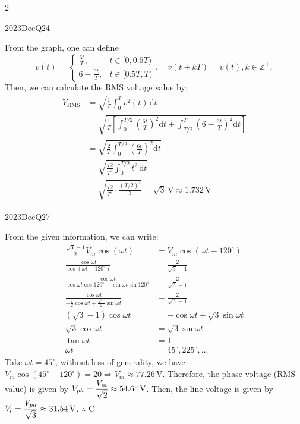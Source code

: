 \begin{multicols}{2}
\begin{qsolution}{2023}{Dec}{Q24}{\tgEE \tgEEPowerSystems \tgEERMS}

    From the graph, one can define
    \[
        v(t)=\begin{cases}
            \frac{6t}{T}, & t\in[0, 0.5T) \\
            6-\frac{6t}{T}, & t\in[0.5T, T)
        \end{cases}, \quad v(t+kT)=v(t), k\in\mathbb{Z}^+,
    \]
    Then, we can calculate the RMS voltage value by:
    \begin{align*}
        V_{\mathrm{RMS}} &= \sqrt{\frac{1}{T}\int_0^{T} v^2(t) \,\mathrm{d}t}\\
        &= \sqrt{\frac{1}{T}\left[\int_0^{T/2}\left(\frac{6t}{T}\right)^2\mathrm{d}t
            + \int_{T/2}^{T}\left(6-\frac{6t}{T}\right)^2\mathrm{d}t\right]}\\
        &= \sqrt{\frac{2}{T}\int_0^{T/2}\left(\frac{6t}{T}\right)^2\mathrm{d}t}\\
        &= \sqrt{\frac{72}{T^3}\int_0^{T/2} t^2\,\mathrm{d}t}\\
        &= \sqrt{\frac{72}{T^3}\cdot\frac{(T/2)^3}{3}}
        = \boxed{\sqrt{3}\,\mathrm{V}} \approx 1.732\,\mathrm{V}
    \end{align*}
\end{qsolution}

\begin{qsolution}{2023}{Dec}{Q27}{\tgEE \tgEEThreePhase}

    From the given information, we can write:
    \begin{align*}
        \frac{\sqrt{3}-1}{2}V_m\cos(\omega t) &= V_m\cos(\omega t-120^\circ)\\
        \frac{\cos \omega t}{\cos(\omega t-120^\circ)} &= \frac{2}{\sqrt{3}-1} \\
        \frac{\cos \omega t}{\cos \omega t\cos 120^\circ + \sin\omega t\sin 120^\circ} &= \frac{2}{\sqrt{3}-1}\\
        \frac{\cos \omega t}{-\frac{1}{2}\cos \omega t + \frac{\sqrt{3}}{2}\sin \omega t} &= \frac{2}{\sqrt{3}-1}\\
        \left(\sqrt{3}-1\right)\cos\omega t &= -\cos \omega t + \sqrt{3}\sin \omega t\\
        \sqrt{3}\cos \omega t &= \sqrt{3}\sin \omega t\\
        \tan \omega t &=1\\
        \omega t&=45^\circ, 225^\circ, \ldots
    \end{align*}
    Take $\omega t=45^\circ$, without loss of generality, we have $V_m\cos(45^\circ-120^\circ)=20 \Rightarrow V_m\approx 77.26\,\mathrm{V}$.
    Therefore, the phase voltage (RMS value) is given by $\displaystyle V_{ph}=\frac{V_m}{\sqrt 2}\approx 54.64\,\mathrm{V}$.
    Then, the line voltage is given by $\displaystyle V_l=\frac{V_{ph}}{\sqrt 3}\approx 31.54\,\mathrm{V}$.
    \hfill$\therefore$ C
\end{qsolution}


\end{multicols}

